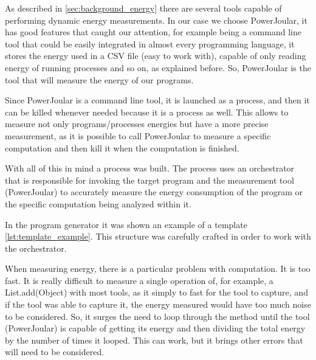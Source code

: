 As described in \ref{sec:background_energy} there are several tools capable of performing dynamic energy measurements. In our case we choose PowerJoular, it has good features that caught our attention, for example being a command line tool that could be easily integrated in almost every programming language, it stores the energy used in a CSV file (easy to work with), capable of only reading energy of running processes and so on, as explained before. So, PowerJoular is the tool that will measure the energy of our programs.

Since PowerJoular is a command line tool, it is launched as a process, and then it can be killed whenever needed because it is a process as well. This allows to measure not only programs/processes energies but have a more precise measurement, as it is possible to call PowerJoular to measure a specific computation and then kill it when the computation is finished.

With all of this in mind a process was built. The process uses an orchestrator that is responsible for invoking the target program and the measurement tool (PowerJoular) to accurately measure the energy consumption of the program or the specific computation being analyzed within it.

In the program generator it was shown an example of a template \ref{lst:template_example}. This structure was carefully crafted in order to work with the orchestrator.



When measuring energy, there is a particular problem with computation. It is too fast. It is really difficult to measure a single operation of, for example, a List.add(Object) with most tools, as it simply to fast for the tool to capture, and if the tool was able to capture it, the energy measured would have too much noise to be considered. So, it surges the need to loop through the method until the tool (PowerJoular) is capable of getting its energy and then dividing the total energy by the number of times it looped. This can work, but it brings other errors that will need to be considered.

